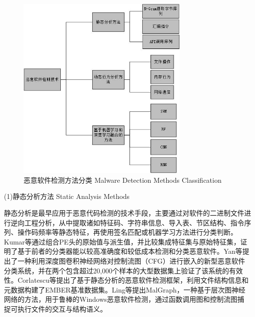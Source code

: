 \begin{figure}[hbt]
	\centering
	\includegraphics[width=0.75\textwidth]{figures/2.2}
	\caption{恶意软件检测方法分类 Malware Detection Methods Classification}\label{fig:2.2}
\end{figure}

 
(1)静态分析方法  Static Analysis Methods

静态分析是最早应用于恶意代码检测的技术手段，主要通过对软件的二进制文件进行逆向工程分析，从中提取诸如特征码、字符串信息、导入表、节区结构、指令序列、操作码频率等静态特征，再使用签名匹配或机器学习方法进行分类判断。Kumar等\cite{kumar2019learning}通过组合PE头的原始值与派生值，并比较集成特征集与原始特征集，证明了基于前者的分类器能以较高准确度和较低成本检测和分类恶意软件。Yan等\cite{yan2019classifying}提出了一种利用深度图卷积神经网络对控制流图（CFG）进行嵌入的新型恶意软件分类系统，并在两个包含超过20,000个样本的大型数据集上验证了该系统的有效性。Corlatescu等\cite{corlatescu2023embersim}提出了基于静态分析的恶意软件检测框架，利用文件结构信息和元数据构建了EMBER基准数据集。Ling等\cite{ling2022malgraph}提出MalGraph，一种基于层次图神经网络的方法，用于鲁棒的Windows恶意软件检测，通过函数调用图和控制流图捕捉可执行文件的交互与结构语义。

